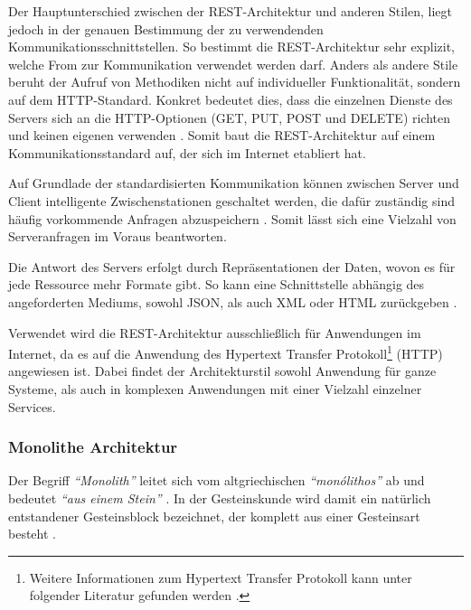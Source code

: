 Der Hauptunterschied zwischen der REST-Architektur und anderen Stilen, liegt jedoch in der genauen Bestimmung der zu verwendenden Kommunikationsschnittstellen. So bestimmt die REST-Architektur sehr explizit, welche From zur Kommunikation verwendet werden darf. Anders als andere Stile beruht der Aufruf von Methodiken nicht auf individueller Funktionalität, sondern auf dem HTTP-Standard. Konkret bedeutet dies, dass die einzelnen Dienste des Servers sich an die HTTP-Optionen (GET, PUT, POST und DELETE) richten und keinen eigenen verwenden \parencite[vlg.][S. 128]{starke_effektive_2015}. Somit baut die REST-Architektur auf einem Kommunikationsstandard auf, der sich im Internet etabliert hat.

Auf Grundlade der standardisierten Kommunikation können zwischen Server und Client intelligente Zwischenstationen geschaltet werden, die dafür zuständig sind häufig vorkommende Anfragen abzuspeichern \parencites[vlg.][S. 79 f.]{fielding_architectural_2000}[][S. 128]{starke_effektive_2015}. Somit lässt sich eine Vielzahl von Serveranfragen im Voraus beantworten.

Die Antwort des Servers erfolgt durch Repräsentationen der Daten, wovon es für jede Ressource mehr Formate gibt. So kann eine Schnittstelle abhängig des angeforderten Mediums, sowohl JSON­, als auch XML­ oder HTML zurückgeben \parencite[vgl.][S. 128]{starke_effektive_2015}.

Verwendet wird die REST-Architektur ausschließlich für Anwendungen im Internet, da es auf die Anwendung des Hypertext Transfer Protokoll\footnote{Weitere Informationen zum Hypertext Transfer Protokoll kann unter folgender Literatur gefunden werden \parencite{leach_hypertext_2020}.} (HTTP) angewiesen ist. Dabei findet der Architekturstil sowohl Anwendung für ganze Systeme, als auch in komplexen Anwendungen mit einer Vielzahl einzelner Services.

\subsubsection{Monolithe Architektur}

Der Begriff \textit{\enquote{Monolith}} leitet sich vom altgriechischen \textit{\enquote{monólithos}} ab und bedeutet \textit{\enquote{aus einem Stein}} \parencites[vlg.][]{duden_nodate}[vgl.][]{dwds_nodate}. In der Gesteinskunde wird damit ein natürlich entstandener Gesteinsblock bezeichnet, der komplett aus einer Gesteinsart besteht \parencite[vgl.][]{dwds_nodate}.

